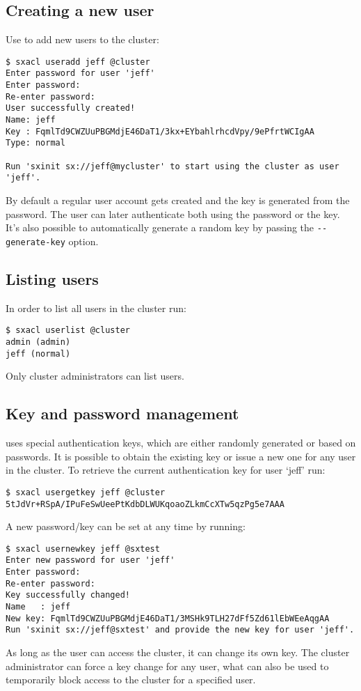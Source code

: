 \subsection{Creating a new user}
Use  to add new users to the cluster:
\begin{lstlisting}
$ sxacl useradd jeff @cluster
Enter password for user 'jeff'
Enter password:
Re-enter password: 
User successfully created!
Name: jeff
Key : FqmlTd9CWZUuPBGMdjE46DaT1/3kx+EYbahlrhcdVpy/9ePfrtWCIgAA
Type: normal

Run 'sxinit sx://jeff@mycluster' to start using the cluster as user 'jeff'.
\end{lstlisting}
By default a regular user account gets created and the key is generated from the
password. The user can later authenticate both using the password or the key.
It's also possible to automatically generate a random key by passing the
\verb+--generate-key+ option.

\subsection{Listing users}
In order to list all users in the cluster run:
\begin{lstlisting}
$ sxacl userlist @cluster
admin (admin)
jeff (normal)
\end{lstlisting}
Only cluster administrators can list users.

\subsection{Key and password management}
\SX uses special authentication keys, which are either randomly
generated or based on passwords. It is possible to obtain the
existing key or issue a new one for any user in the cluster.
To retrieve the current authentication key for user `jeff' run:
\begin{lstlisting}
$ sxacl usergetkey jeff @cluster
5tJdVr+RSpA/IPuFeSwUeePtKdbDLWUKqoaoZLkmCcXTw5qzPg5e7AAA
\end{lstlisting}
A new password/key can be set at any time by running:
\begin{lstlisting}
$ sxacl usernewkey jeff @sxtest
Enter new password for user 'jeff'
Enter password:
Re-enter password: 
Key successfully changed!
Name   : jeff
New key: FqmlTd9CWZUuPBGMdjE46DaT1/3MSHk9TLH27dFf5Zd61lEbWEeAqgAA
Run 'sxinit sx://jeff@sxtest' and provide the new key for user 'jeff'.
\end{lstlisting}
As long as the user can access the cluster, it can change its own
key. The cluster administrator can force a key change for any user,
what can also be used to temporarily block access to the cluster for
a specified user.

